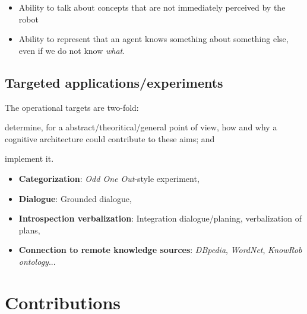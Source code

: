 \begin{itemize}
	\item Ability to talk about concepts that are not immediately perceived by
	the robot


	\item {} Ability to
	represent that an agent knows something about something else, even if we do
	not know \emph{what}.

\end{itemize}

\subsection{Targeted applications/experiments}
\label{sect|targeted-applications-experiments}


The operational targets are two-fold:

\begin{inparaenum}

	\item determine, for a abstract/theoritical/general point of view, how and
	why a cognitive architecture could contribute to these aims; and

	\item implement it.

\end{inparaenum}

\begin{itemize}
	\item \textbf{Categorization}: \emph{Odd One Out}-style experiment,
	\item \textbf{Dialogue}: Grounded dialogue,
	\item \textbf{Introspection verbalization}: Integration dialogue/planing, verbalization of plans,
	\item \textbf{Connection to remote knowledge sources}: \emph{DBpedia}, \emph{WordNet}, \emph{KnowRob ontology}...
\end{itemize}




\section{Contributions}
\label{sect|contributions}

